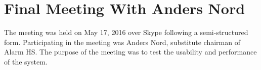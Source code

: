 \section{Final Meeting With Anders Nord}

The meeting was held on May 17, 2016 over Skype following a semi-structured form. Participating in the meeting was Anders Nord, substitute chairman of Alarm HS. The purpose of the meeting was to test the usability and performance of the system.

